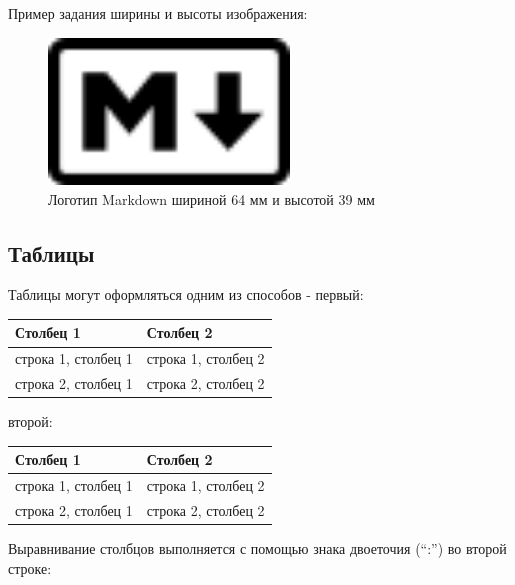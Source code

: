\documentclass[
  a4paper,
]{book}
\theoremstyle{definition}
\theoremstyle{definition}
\theoremstyle{definition}
\theoremstyle{definition}
\theoremstyle{remark}
\begin{document}
Пример задания ширины и высоты изображения:

\begin{figure}
\centering
\includegraphics[width=\textwidth,height=39mm]{figures/Markdown-mark.png}
\caption{\label{fig:md-logo-w-64mm-h-39mm} Логотип Markdown шириной 64 мм и высотой 39 мм}
\end{figure}

\hypertarget{markdown-syntax-tables}{%
\subsection{Таблицы}\label{markdown-syntax-tables}}

Таблицы могут оформляться одним из способов - первый:

\begin{longtable}[]{@{}ll@{}}
\toprule\noalign{}
\textbf{Столбец 1} & \textbf{Столбец 2} \\
\midrule\noalign{}
\endhead
\bottomrule\noalign{}
\endlastfoot
строка 1, столбец 1 & строка 1, столбец 2 \\
строка 2, столбец 1 & строка 2, столбец 2 \\
\end{longtable}

второй:

\begin{longtable}[]{@{}ll@{}}
\toprule\noalign{}
\textbf{Столбец 1} & \textbf{Столбец 2} \\
\midrule\noalign{}
\endhead
\bottomrule\noalign{}
\endlastfoot
строка 1, столбец 1 & строка 1, столбец 2 \\
строка 2, столбец 1 & строка 2, столбец 2 \\
\end{longtable}

Выравнивание столбцов выполняется с помощью знака двоеточия (``:'') во второй строке:
\end{document}
